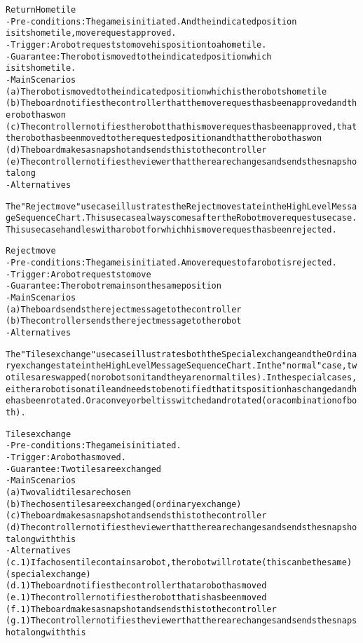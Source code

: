 \begin{alltt}
Return Home tile
- Pre-conditions: The game is initiated. And the indicated position
    is its home tile, move request approved.
- Trigger: A robot requests to move his position to a home tile.
- Guarantee: The robot is moved to the indicated position which
    is its home tile.
- Main Scenarios
    (a) The robot is moved to the indicated position which is the robots home tile
    (b) The board notifies the controller that the move request has been approved and the robot has won
    (c) The controller notifies the robot that his move request has been approved, that the robot has been moved to the requested position and that the robot has won
    (d) The board makes a snapshot and sends this to the controller
    (e) The controller notifies the viewer that there are changes and sends the snapshot along
- Alternatives

The "Reject move" use case illustrates the Reject move state in the High Level Message Sequence Chart. This use case always comes after the Robot move request use case. This use case handles with a robot for which his move request has been rejected.

Reject move
- Pre-conditions: The game is initiated. A move request of a robot is rejected.
- Trigger: A robot requests to move
- Guarantee: The robot remains on the same position
- Main Scenarios
    (a) The board sends the reject message to the controller
    (b) The controller sends the reject message to the robot
- Alternatives

The "Tiles exchange" use case illustrates both the Special exchange and the Ordinary exchange state in the High Level Message Sequence Chart. In the "normal" case, two tiles are swapped (no robots on it and they are normal tiles). In the special cases, either a robot is on a tile and needs to be notified that its position has changed and he has been rotated. Or a conveyor belt is switched and rotated (or a combination of both).

Tiles exchange
- Pre-conditions: The game is initiated.
- Trigger:  A robot has moved.
- Guarantee: Two tiles are exchanged
- Main Scenarios
    (a) Two valid tiles are chosen
    (b) The chosen tiles are exchanged (ordinary exchange)
    (c) The board makes a snapshot and sends this to the controller
    (d) The controller notifies the viewer that there are changes and sends the snapshot along with this
- Alternatives
    (c.1) If a chosen tile contains a robot, the robot will rotate (this can be the same) (special exchange)
    (d.1) The board notifies the controller that a robot has moved
    (e.1) The controller notifies the robot that is has been moved
    (f.1) The board makes a snapshot and sends this to the controller
    (g.1) The controller notifies the viewer that there are changes and sends the snapshot along with this


\end{alltt}
